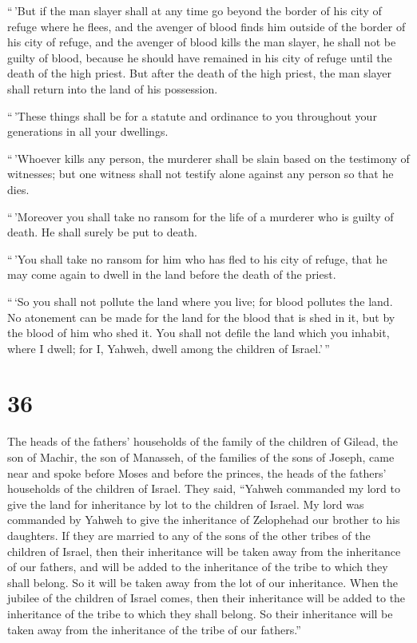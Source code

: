  ``\,'But if the man slayer shall at any time go beyond
the border of his city of refuge where he flees,  and the
avenger of blood finds him outside of the border of his city of refuge,
and the avenger of blood kills the man slayer, he shall not be guilty of
blood,  because he should have remained in his city of
refuge until the death of the high priest. But after the death of the
high priest, the man slayer shall return into the land of his
possession.

 ``\,'These things shall be for a statute and ordinance
to you throughout your generations in all your dwellings.

 ``\,'Whoever kills any person, the murderer shall be
slain based on the testimony of witnesses; but one witness shall not
testify alone against any person so that he dies.

 ``\,'Moreover you shall take no ransom for the life of a
murderer who is guilty of death. He shall surely be put to death.

 ``\,'You shall take no ransom for him who has fled to
his city of refuge, that he may come again to dwell in the land before
the death of the priest.

 ``\,`So you shall not pollute the land where you live;
for blood pollutes the land. No atonement can be made for the land for
the blood that is shed in it, but by the blood of him who shed it.
 You shall not defile the land which you inhabit, where I
dwell; for I, Yahweh, dwell among the children of Israel.'\,''

\hypertarget{section-35}{%
\section{36}\label{section-35}}

 The heads of the fathers' households of the family of the
children of Gilead, the son of Machir, the son of Manasseh, of the
families of the sons of Joseph, came near and spoke before Moses and
before the princes, the heads of the fathers' households of the children
of Israel.  They said, ``Yahweh commanded my lord to give
the land for inheritance by lot to the children of Israel. My lord was
commanded by Yahweh to give the inheritance of Zelophehad our brother to
his daughters.  If they are married to any of the sons of
the other tribes of the children of Israel, then their inheritance will
be taken away from the inheritance of our fathers, and will be added to
the inheritance of the tribe to which they shall belong. So it will be
taken away from the lot of our inheritance.  When the
jubilee of the children of Israel comes, then their inheritance will be
added to the inheritance of the tribe to which they shall belong. So
their inheritance will be taken away from the inheritance of the tribe
of our fathers.''


